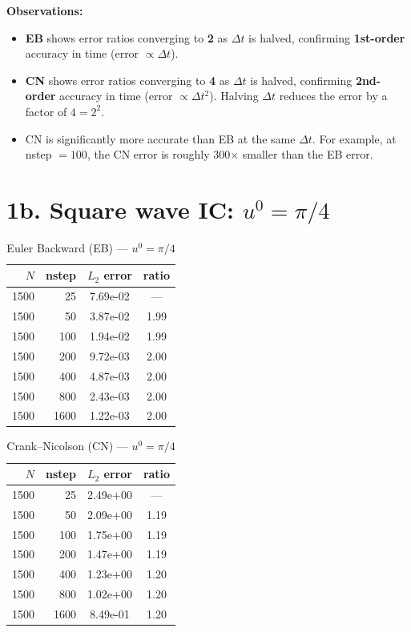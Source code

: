 \documentclass[11pt]{article}
\begin{document}
\noindent\textbf{Observations:}
\begin{itemize}[nosep]
  \item \textbf{EB} shows error ratios converging to \textbf{2} as $\Delta t$ is halved,
        confirming \textbf{1st-order} accuracy in time (error $\propto \Delta t$).
  \item \textbf{CN} shows error ratios converging to \textbf{4} as $\Delta t$ is halved,
        confirming \textbf{2nd-order} accuracy in time (error $\propto \Delta t^2$).
        Halving $\Delta t$ reduces the error by a factor of $4 = 2^2$.
  \item CN is significantly more accurate than EB at the same $\Delta t$.
        For example, at nstep $= 100$, the CN error is roughly 300$\times$ smaller than the EB error.
\end{itemize}

\newpage
\section*{1b. Square wave IC: $u^0 = \pi/4$}

\begin{table}[h!]
\centering
\caption{Euler Backward (EB) --- $u^0 = \pi/4$}
\begin{tabular}{rr cc}
\toprule
$N$ & nstep & $L_2$ error & ratio \\
\midrule
1500 &   25 & 7.69e-02 & --- \\
1500 &   50 & 3.87e-02 & 1.99 \\
1500 &  100 & 1.94e-02 & 1.99 \\
1500 &  200 & 9.72e-03 & 2.00 \\
1500 &  400 & 4.87e-03 & 2.00 \\
1500 &  800 & 2.43e-03 & 2.00 \\
1500 & 1600 & 1.22e-03 & 2.00 \\
\bottomrule
\end{tabular}
\end{table}

\begin{table}[h!]
\centering
\caption{Crank--Nicolson (CN) --- $u^0 = \pi/4$}
\begin{tabular}{rr cc}
\toprule
$N$ & nstep & $L_2$ error & ratio \\
\midrule
1500 &   25 & 2.49e+00 & --- \\
1500 &   50 & 2.09e+00 & 1.19 \\
1500 &  100 & 1.75e+00 & 1.19 \\
1500 &  200 & 1.47e+00 & 1.19 \\
1500 &  400 & 1.23e+00 & 1.20 \\
1500 &  800 & 1.02e+00 & 1.20 \\
1500 & 1600 & 8.49e-01 & 1.20 \\
\bottomrule
\end{tabular}
\end{table}
\end{document}
